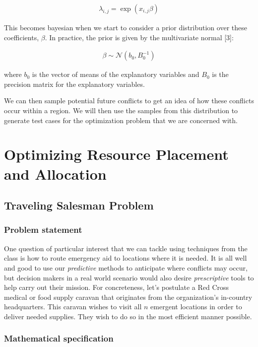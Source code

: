 \documentclass{article} %
\begin{document}
\begin{align}
\lambda_{i,j}  = \exp(x_{i,j} \beta)
\end{align}

This becomes bayesian when we start to consider a prior distribution over these coefficients, $\beta$. In practice, the prior is given by the multivariate normal [3]:

\begin{align}
\beta  \sim \mathcal{N}(b_0, B^{-1}_0)
\end{align}

where $b_0$ is the vector of means of the explanatory variables and $B_0$ is the precision matrix for the explanatory variables.

We can then sample potential future conflicts to get an idea of how these conflicts occur within a region. We will then use the samples from this distribution to generate test cases for the optimization problem that we are concerned with.

\section{Optimizing Resource Placement and Allocation}

\subsection*{Traveling Salesman Problem}

\subsubsection*{Problem statement}

One question of particular interest that we can tackle using techniques from the class is how to route emergency aid
to locations where it is needed.  It is all well and good to use our \emph{predictive} methods to anticipate where
conflicts may occur, but decision makers in a real world scenario would also desire \emph{prescriptive} tools to help
carry out their mission. For concreteness, let's postulate a Red Cross medical or food supply caravan that originates
from the organization's in-country headquarters. This caravan wishes to visit all $n$ emergent locations in order to
deliver needed supplies. They wish to do so in the most efficient manner possible.

\subsubsection*{Mathematical specification}
\end{document}
